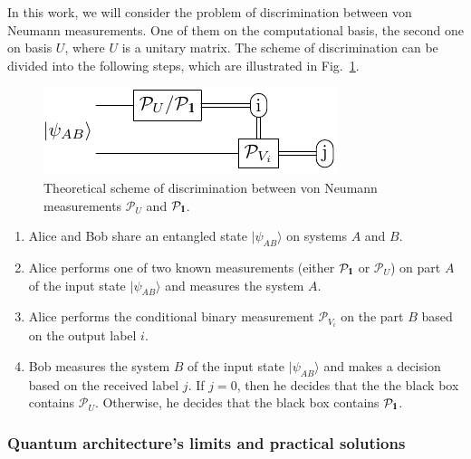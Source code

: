 \documentclass[preprint,12pt, a4paper]{elsarticle}
\newcommand{\ket}[1]{\ensuremath{|#1\rangle}}
\newcommand{\1}{{\rm 1\hspace{-0.9mm}l}}
\newcommand{\Id}{{\rm 1\hspace{-0.9mm}l}}
\newcommand{\PP}{\mathcal{P}}
\begin{document}
In this work, we will consider the problem of discrimination between von Neumann 
measurements. One of them on the computational basis, the second one on basis 
$U$, where $U$ is a unitary matrix. 
The scheme of discrimination can be divided into the following steps, which are 
illustrated in Fig.~\ref{fig:theoretical_scheme}.


\begin{figure}[h!]
	\centering
	\includegraphics[scale=1.7]{pics/theoretical_scheme}
	\caption{Theoretical  scheme of discrimination  between von Neumann measurements $\PP_{U}$ and $\PP_\Id$. }
	\label{fig:theoretical_scheme}
\end{figure}



\begin{enumerate}
	\item Alice and Bob share an entangled state $\ket{\psi_{AB}}$ on systems 
	$A$ and $B$.
	\item Alice performs one of two known measurements (either $\PP_{\Id}$ or 
	$\PP_{U}$) on part $A$ of the input state  $\ket{\psi_{AB}}$ and measures the system $A$.
	\item Alice performs the conditional binary measurement $\PP_{V_i}$ on the part 
	$B$ based on the output label $i$. 
	\item  Bob measures the system $B$ of the input state  $\ket{\psi_{AB}}$ and 
	makes a decision based on the received label $j$. If $j=0$, then he decides 
	that the the black box contains $\PP_U$. Otherwise, he decides that the 
	black box contains $\PP_{\Id}$. 
\end{enumerate}  



\subsubsection{Quantum architecture's limits and practical solutions}
\end{document}
